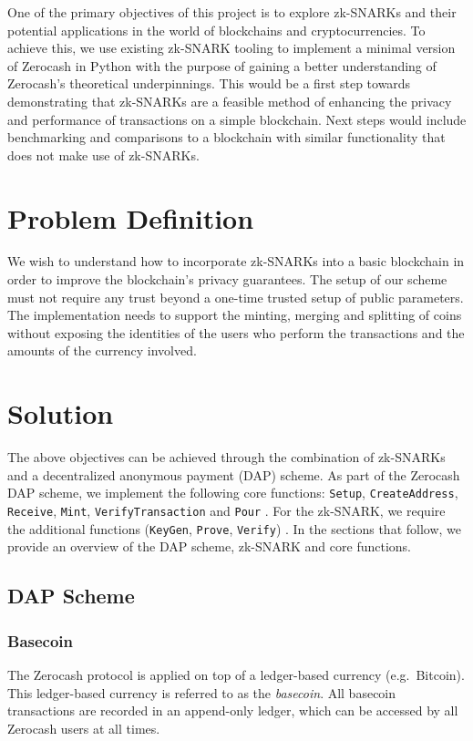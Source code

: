 \documentclass{article}
\begin{document}
One of the primary objectives of this project is to explore zk-SNARKs and their potential applications in the world of blockchains and cryptocurrencies. To achieve this, we use existing zk-SNARK tooling to implement a minimal version of Zerocash in Python with the purpose of gaining a better understanding of Zerocash's theoretical underpinnings. This would be a first step towards demonstrating that zk-SNARKs are a feasible method of enhancing the privacy and performance of transactions on a simple blockchain. Next steps would include benchmarking and comparisons to a blockchain with similar functionality that does not make use of zk-SNARKs.

\section{Problem Definition}
We wish to understand how to incorporate zk-SNARKs into a basic blockchain in order to improve the blockchain's privacy guarantees. The setup of our scheme must not require any trust beyond a one-time trusted setup of public parameters. The implementation needs to support the minting, merging and splitting of coins without exposing the identities of the users who perform the transactions and the amounts of the currency involved.

\section{Solution}
The above objectives can be achieved through the combination of zk-SNARKs and a decentralized anonymous payment (DAP) scheme. As part of the Zerocash DAP scheme, we implement the following core functions: \texttt{Setup}, \texttt{CreateAddress}, \texttt{Receive}, \texttt{Mint}, \texttt{VerifyTransaction} and \texttt{Pour} \cite{zerocash}. For the zk-SNARK, we require the additional functions (\texttt{KeyGen}, \texttt{Prove}, \texttt{Verify}) \cite{zerocash}. In the sections that follow, we provide an overview of the DAP scheme, zk-SNARK and core functions.

\subsection{DAP Scheme}
\subsubsection{Basecoin}
The Zerocash protocol is applied on top of a ledger-based currency (e.g.\ Bitcoin). This ledger-based currency is referred to as the \emph{basecoin}. All basecoin transactions are recorded in an append-only ledger, which can be accessed by all Zerocash users at all times.
\end{document}
